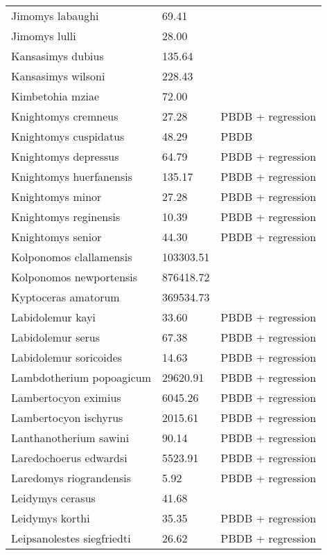 \documentclass{article}
\begin{document}
\begin{center}
\begin{longtable}{p{} p{} p{}}
    Jimomys labaughi & 69.41 & \cite{Tomiya2013} \\ 
    Jimomys lulli & 28.00 & \cite{McKenna2011} \\ 
    Kansasimys dubius & 135.64 & \cite{Tomiya2013} \\ 
    Kansasimys wilsoni & 228.43 & \cite{Matthew1901} \\ 
    Kimbetohia mziae & 72.00 & \cite{Wilson2012} \\ 
    Knightomys cremneus & 27.28 & PBDB + regression \\ 
    Knightomys cuspidatus & 48.29 & PBDB \\ 
    Knightomys depressus & 64.79 & PBDB + regression \\ 
    Knightomys huerfanensis & 135.17 & PBDB + regression \\ 
    Knightomys minor & 27.28 & PBDB + regression \\ 
    Knightomys reginensis & 10.39 & PBDB + regression \\ 
    Knightomys senior & 44.30 & PBDB + regression \\ 
    Kolponomos clallamensis & 103303.51 & \cite{Tseng2009} \\ 
    Kolponomos newportensis & 876418.72 & \cite{Scott2013} \\ 
    Kyptoceras amatorum & 369534.73 & \cite{Tomiya2013} \\ 
    Labidolemur kayi & 33.60 & PBDB + regression \\ 
    Labidolemur serus & 67.38 & PBDB + regression \\ 
    Labidolemur soricoides & 14.63 & PBDB + regression \\ 
    Lambdotherium popoagicum & 29620.91 & PBDB + regression \\ 
    Lambertocyon eximius & 6045.26 & PBDB + regression \\ 
    Lambertocyon ischyrus & 2015.61 & PBDB + regression \\ 
    Lanthanotherium sawini & 90.14 & PBDB + regression \\ 
    Laredochoerus edwardsi & 5523.91 & PBDB + regression \\ 
    Laredomys riograndensis & 5.92 & PBDB + regression \\ 
    Leidymys cerasus & 41.68 & \cite{Tomiya2013} \\ 
    Leidymys korthi & 35.35 & PBDB + regression \\ 
    Leipsanolestes siegfriedti & 26.62 & PBDB + regression \\ 

\end{longtable}
\end{center}
\end{document}
